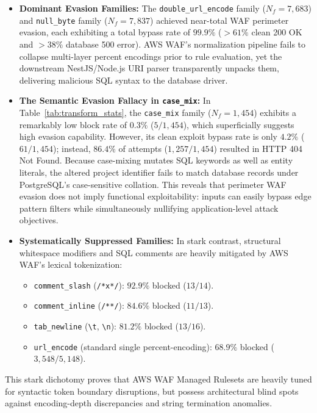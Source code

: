 \begin{itemize}
  \item \textbf{Dominant Evasion Families:} The \texttt{double\_url\_encode} family ($N_f=7{,}683$) and \texttt{null\_byte} family ($N_f=7{,}837$) achieved near-total WAF perimeter evasion, each exhibiting a total bypass rate of $99.9\%$ ($>61\%$ clean 200 OK and $>38\%$ database 500 error). AWS WAF's normalization pipeline fails to collapse multi-layer percent encodings prior to rule evaluation, yet the downstream NestJS/Node.js URI parser transparently unpacks them, delivering malicious SQL syntax to the database driver.
  \item \textbf{The Semantic Evasion Fallacy in \texttt{case\_mix}:} In Table~\ref{tab:transform_stats}, the \texttt{case\_mix} family ($N_f=1{,}454$) exhibits a remarkably low block rate of $0.3\%$ ($5/1{,}454$), which superficially suggests high evasion capability. However, its clean exploit bypass rate is only $4.2\%$ ($61/1{,}454$); instead, $86.4\%$ of attempts ($1{,}257/1{,}454$) resulted in HTTP 404 Not Found. Because case-mixing mutates SQL keywords as well as entity literals, the altered project identifier fails to match database records under PostgreSQL's case-sensitive collation. This reveals that perimeter WAF evasion does not imply functional exploitability: inputs can easily bypass edge pattern filters while simultaneously nullifying application-level attack objectives.
  \item \textbf{Systematically Suppressed Families:} In stark contrast, structural whitespace modifiers and SQL comments are heavily mitigated by AWS WAF's lexical tokenization:
  \begin{itemize}
    \item \texttt{comment\_slash} (\texttt{/*x*/}): $92.9\%$ blocked ($13/14$).
    \item \texttt{comment\_inline} (\texttt{/**/}): $84.6\%$ blocked ($11/13$).
    \item \texttt{tab\_newline} (\texttt{\textbackslash t}, \texttt{\textbackslash n}): $81.2\%$ blocked ($13/16$).
    \item \texttt{url\_encode} (standard single percent-encoding): $68.9\%$ blocked ($3{,}548/5{,}148$).
  \end{itemize}
\end{itemize}
This stark dichotomy proves that AWS WAF Managed Rulesets are heavily tuned for syntactic token boundary disruptions, but possess architectural blind spots against encoding-depth discrepancies and string termination anomalies.

